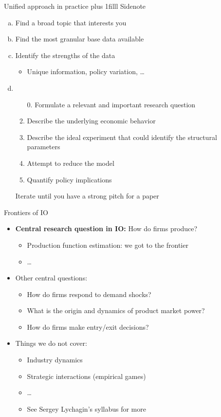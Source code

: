 \documentclass[aspectratio=169,compress,t,xcolor=table]{beamer}
\newcommand{\myhfill}[1]{\hskip0pt plus 1filll {\small #1}}
\begin{document}
{\begin{frame}{Unified approach in practice \myhfill{Sidenote}}
  \begin{enumerate}[a.]
    \vfill\item Find a broad topic that interests you
    \vfill\item Find the most granular base data available
    \vfill\item Identify the strengths of the data
    \begin{itemize}
      \item Unique information, policy variation, \ldots
    \end{itemize}
    \vfill\item 
    \begin{enumerate}[1.]
      \vfill\item[0.] Formulate a relevant and important research question
      \vfill\item Describe the underlying economic behavior
      \vfill\item Describe the ideal experiment that could identify the structural parameters
      \vfill\item Attempt to reduce the model
      \vfill\item Quantify policy implications
    \end{enumerate}
    \vfill\item[] Iterate until you have a strong pitch for a paper
  \end{enumerate}
\end{frame}
}

\begin{frame}{Frontiers of IO}
  \begin{itemize}
    \vfill\item {\color{MyStructure}\textbf{Central research question in IO:}} How do firms produce?
    \begin{itemize}
      \item Production function estimation: we got to the frontier
      \item \ldots
    \end{itemize}
    \vfill\item Other central questions:
    \begin{itemize}
      \item How do firms respond to demand shocks?
      \item What is the origin and dynamics of product market power?
      \item How do firms make entry/exit decisions?
    \end{itemize}
    \vfill\item Things we do not cover:
    \begin{itemize}
      \item Industry dynamics
      \item Strategic interactions (empirical games)
      \item \ldots
      \item See Sergey Lychagin's syllabus for more
    \end{itemize}
  \end{itemize}
\end{frame}
\end{document}
